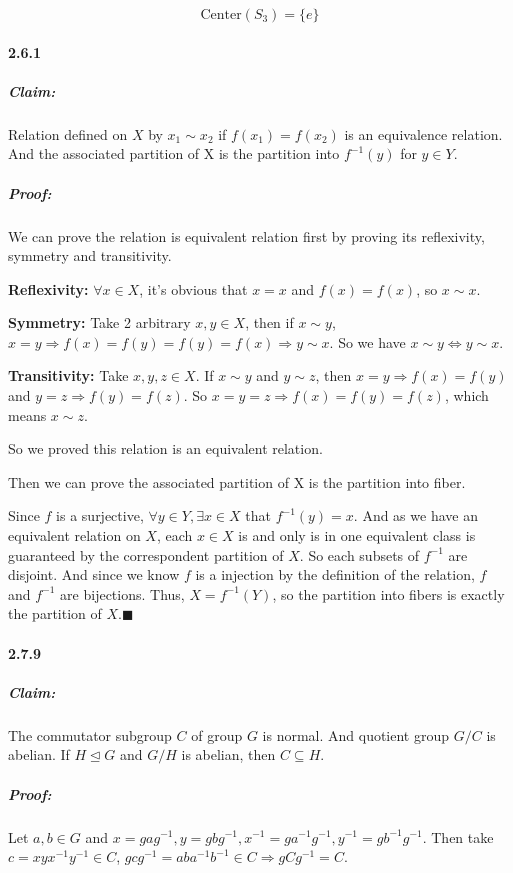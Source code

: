\documentclass[11pt]{article}
\begin{document}
			\[\mathrm{Center}(S_3) = \{e\}\]
	\paragraph{2.6.1}
		\subparagraph{Claim:} Relation defined on $X$ by $x_1 \sim x_2$ if $f(x_1) = f(x_2)$ is an equivalence relation. And the associated partition of X is the partition into $f^{-1}(y)$ for $y \in Y$.
		
		\subparagraph{Proof:} We can prove the relation is equivalent relation first by proving its reflexivity, symmetry and transitivity.
		
		\textbf{Reflexivity:} $\forall x \in X$, it's obvious that $x = x$ and $f(x) = f(x)$, so $x \sim x$.
		
		\textbf{Symmetry:} Take 2 arbitrary $x, y \in X$, then if $x \sim y$, $x = y \Rightarrow f(x) = f(y) = f(y) = f(x) \Rightarrow y \sim x$. So we have $x \sim y \Leftrightarrow y \sim x$.
		
		\textbf{Transitivity:} Take $x, y, z \in X$. If $x \sim y$ and $y \sim z$, then $x = y \Rightarrow f(x) = f(y)$ and $y = z \Rightarrow f(y) = f(z)$. So $x = y = z \Rightarrow f(x) = f(y) = f(z)$, which means $x \sim z$.
		
		So we proved this relation is an equivalent relation.
		
		Then we can prove the associated partition of X is the partition into fiber.
		
		Since $f$ is a surjective, $\forall y \in Y, \exists x \in X$ that $f^{-1}(y) = x$. And as we have an equivalent relation on $X$, each $x \in X$ is and only is in one equivalent class is guaranteed by the correspondent partition of $X$. So each subsets of $f^{-1}$ are disjoint. And since we know $f$ is a injection by the definition of the relation, $f$ and $f^{-1}$ are bijections. Thus, $X = f^{-1}(Y)$, so the partition into fibers is exactly the partition of $X$.$\blacksquare$
		
	\paragraph{2.7.9}
		\subparagraph{Claim:} The commutator subgroup $C$ of group $G$ is normal. And quotient group $G / C$ is abelian. If $H \unlhd G$ and $G /H$ is abelian, then $C \subseteq H$. 
		
		\subparagraph{Proof:} Let $a, b \in G$ and $x = gag^{-1}, y = gbg^{-1}, x^{-1} = ga^{-1}g^{-1}, y^{-1} = gb^{-1}g^{-1}$. Then take $c = xyx^{-1}y^{-1} \in C$, $gcg^{-1} = aba^{-1}b^{-1} \in C \Rightarrow gCg^{-1} = C$.
		
\end{document}
